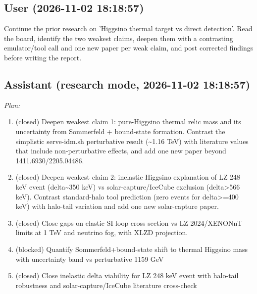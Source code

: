 \documentclass[11pt,a4paper]{article}
\begin{document}
\subsection*{User \small(2026-11-02 18:18:57)}
Continue the prior research on 'Higgsino thermal target vs direct detection'. Read the board, identify the two weakest claims, deepen them with a contrasting emulator/tool call and one new paper per weak claim, and post corrected findings before writing the report.

\subsection*{Assistant \small(research mode, 2026-11-02 18:18:57)}
\textit{Plan:}\begin{enumerate}
  \item (closed) Deepen weakest claim 1: pure-Higgsino thermal relic mass and its uncertainty from Sommerfeld + bound-state formation. Contrast the simplistic serve-idm.sh perturbative result (\textasciitilde{}1.16 TeV) with literature values that include non-perturbative effects, and add one new paper beyond 1411.6930/2205.04486.
  \item (closed) Deepen weakest claim 2: inelastic Higgsino explanation of LZ 248 keV event (delta\textasciitilde{}350 keV) vs solar-capture/IceCube exclusion (delta\textgreater{}566 keV). Contrast standard-halo tool prediction (zero events for delta\textgreater{}=400 keV) with halo-tail variation and add one new solar-capture paper.
  \item (closed) Close gaps on elastic SI loop cross section vs LZ 2024/XENONnT limits at 1 TeV and neutrino fog, with XLZD projection.
  \item (blocked) Quantify Sommerfeld+bound-state shift to thermal Higgsino mass with uncertainty band vs perturbative 1159 GeV
  \item (closed) Close inelastic delta viability for LZ 248 keV event with halo-tail robustness and solar-capture/IceCube literature cross-check
\end{enumerate}
\end{document}

